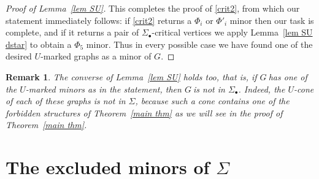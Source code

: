 \documentclass{article}
\newtheorem{remark}{Remark}
\newcommand{\SU}{\ensuremath{\Sig_\bullet}}
\newcommand{\umm}{\ensuremath{U}-marked minor}
\newcommand{\Sig}{\ensuremath{\Sigma}}
\newcommand{\g}{\ensuremath{G\ }}
\newcommand{\G}{\ensuremath{G}}
\newcommand{\Lr}[1]{Lemma~\ref{#1}}
\newcommand{\Tr}[1]{Theorem~\ref{#1}}
\begin{document}
\begin{proof}[Proof of \Lr{lem SU}]
This completes the proof of \eqref{crit2}, from which our statement immediately follows: if \eqref{crit2} returns a $\Phi_i$ or $\Phi'_i$ minor then our task is complete, and if it returns a pair of \SU-critical vertices we apply  \Lr{lem SU dstar} to obtain a $\Phi_5$ minor. Thus in every possible case we have found one of the desired $U$-marked graphs as a minor of \G.
\end{proof}

\begin{remark}
\textup{The converse of \Lr{lem SU} holds too, that is, if \g has one of the \umm s as in the statement, then \g is not in \SU. Indeed, the $U$-cone of each of these graphs is not in \Sig,  because such a cone contains one of the forbidden structures of \Tr{main thm} as we will see in the proof of \Tr{main thm}.} 
\end{remark}








\section{The excluded minors of \Sig} \label{sec proof}
\end{document}
